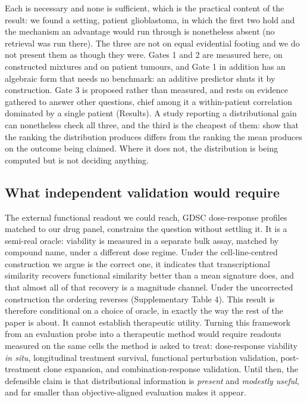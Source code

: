 \documentclass[11pt,letterpaper]{article}
\begin{document}
\noindent Each is necessary and none is sufficient, which is the practical content of the result:
we found a setting, patient glioblastoma, in which the first two hold and the mechanism an
advantage would run through is nonetheless absent (no retrieval was run there).
The three are not on equal evidential footing and we do not present them as though they were.
Gates 1 and 2 are measured here, on constructed mixtures and on patient tumours, and Gate 1 in
addition has an algebraic form that needs no benchmark: an additive predictor shuts it by
construction. Gate 3 is proposed rather than measured, and rests on evidence gathered to answer
other questions, chief among it a within-patient correlation dominated by a single patient
(Results). A study reporting a distributional gain can nonetheless check all three, and the third
is the cheapest of them: show that the ranking the distribution produces differs from the ranking
the mean produces on the outcome being claimed. Where it does not, the distribution is being
computed but is not deciding anything.

\subsection*{What independent validation would require}

The external functional readout we could reach, GDSC dose-response profiles matched to our drug
panel, constrains the question without settling it. It is a semi-real oracle: viability is
measured in a separate bulk assay, matched by compound name, under a different dose regime. Under the
cell-line-centred construction we argue is the correct one, it indicates that transcriptional
similarity recovers functional similarity better than a mean signature does, and that almost all of
that recovery is a magnitude channel. Under the uncorrected construction the ordering reverses
(Supplementary Table 4). This result is therefore conditional on a choice of oracle, in exactly the
way the rest of the paper is about. It cannot establish therapeutic utility. Turning this framework from an evaluation probe into a therapeutic method would require
readouts measured on the same cells the method is asked to treat: dose-response viability
\emph{in situ}, longitudinal treatment survival, functional perturbation validation,
post-treatment clone expansion, and combination-response validation. Until then, the defensible
claim is that distributional information is \textit{present} and \textit{modestly useful}, and far
smaller than objective-aligned evaluation makes it appear.
\end{document}
